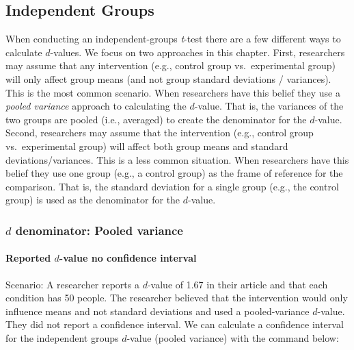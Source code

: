 \documentclass[
]{krantz}
\begin{document}
\hypertarget{independent-groups}{%
\subsection{Independent Groups}\label{independent-groups}}

When conducting an independent-groups \emph{t}-test there are a few different ways to calculate \(d\)-values. We focus on two approaches in this chapter. First, researchers may assume that any intervention (e.g., control group vs.~experimental group) will only affect group means (and not group standard deviations / variances). This is the most common scenario. When researchers have this belief they use a \emph{pooled variance} approach to calculating the \(d\)-value. That is, the variances of the two groups are pooled (i.e., averaged) to create the denominator for the \(d\)-value. Second, researchers may assume that the intervention (e.g., control group vs.~experimental group) will affect both group means and standard deviations/variances. This is a less common situation. When researchers have this belief they use one group (e.g., a control group) as the frame of reference for the comparison. That is, the standard deviation for a single group (e.g., the control group) is used as the denominator for the \(d\)-value.

\hypertarget{d-denominator-pooled-variance}{%
\subsubsection{\texorpdfstring{\(d\) denominator: Pooled variance}{d denominator: Pooled variance}}\label{d-denominator-pooled-variance}}

\hypertarget{reported-d-value-no-confidence-interval}{%
\paragraph{\texorpdfstring{Reported \(d\)-value no confidence interval}{Reported d-value no confidence interval}}\label{reported-d-value-no-confidence-interval}}

Scenario: A researcher reports a \(d\)-value of 1.67 in their article and that each condition has 50 people. The researcher believed that the intervention would only influence means and not standard deviations and used a pooled-variance \(d\)-value. They did not report a confidence interval. We can calculate a confidence interval for the independent groups \(d\)-value (pooled variance) with the command below:
\end{document}
